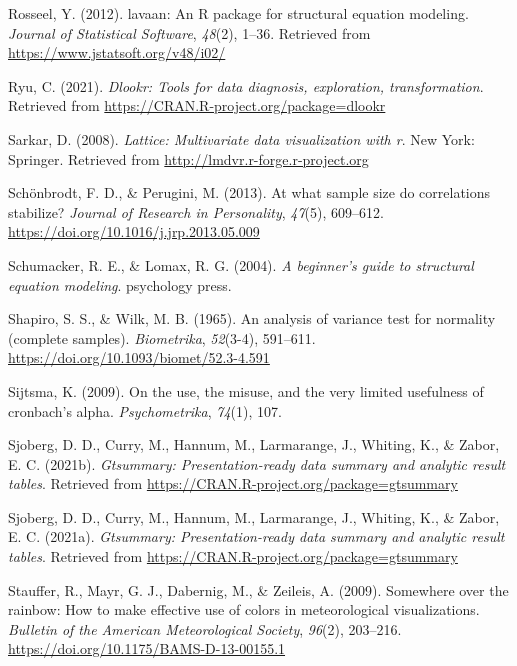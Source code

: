 \documentclass[
  english,
  man]{apa6}
\newlength{\cslhangindent}
\newlength{\cslentryspacingunit} %
\newenvironment{CSLReferences}[2] %
 {%
  \setlength{\parindent}{0pt}
  \ifodd #1
  \let\oldpar\par
  \def\par{\hangindent=\cslhangindent\oldpar}
  \fi
  \setlength{\parskip}{#2\cslentryspacingunit}
 }%
 {}
\begin{document}
\begin{CSLReferences}{1}{0}
\leavevmode{}%
Rosseel, Y. (2012). {lavaan}: An {R} package for structural equation modeling. \emph{Journal of Statistical Software}, \emph{48}(2), 1--36. Retrieved from \url{https://www.jstatsoft.org/v48/i02/}

\leavevmode{}%
Ryu, C. (2021). \emph{Dlookr: Tools for data diagnosis, exploration, transformation}. Retrieved from \url{https://CRAN.R-project.org/package=dlookr}

\leavevmode{}%
Sarkar, D. (2008). \emph{Lattice: Multivariate data visualization with r}. New York: Springer. Retrieved from \url{http://lmdvr.r-forge.r-project.org}

\leavevmode{}%
Schönbrodt, F. D., \& Perugini, M. (2013). At what sample size do correlations stabilize? \emph{Journal of Research in Personality}, \emph{47}(5), 609--612. \url{https://doi.org/10.1016/j.jrp.2013.05.009}

\leavevmode{}%
Schumacker, R. E., \& Lomax, R. G. (2004). \emph{A beginner's guide to structural equation modeling}. psychology press.

\leavevmode{}%
Shapiro, S. S., \& Wilk, M. B. (1965). An analysis of variance test for normality (complete samples). \emph{Biometrika}, \emph{52}(3-4), 591--611. \url{https://doi.org/10.1093/biomet/52.3-4.591}

\leavevmode{}%
Sijtsma, K. (2009). On the use, the misuse, and the very limited usefulness of cronbach's alpha. \emph{Psychometrika}, \emph{74}(1), 107.

\leavevmode{}%
Sjoberg, D. D., Curry, M., Hannum, M., Larmarange, J., Whiting, K., \& Zabor, E. C. (2021b). \emph{Gtsummary: Presentation-ready data summary and analytic result tables}. Retrieved from \url{https://CRAN.R-project.org/package=gtsummary}

\leavevmode{}%
Sjoberg, D. D., Curry, M., Hannum, M., Larmarange, J., Whiting, K., \& Zabor, E. C. (2021a). \emph{Gtsummary: Presentation-ready data summary and analytic result tables}. Retrieved from \url{https://CRAN.R-project.org/package=gtsummary}

\leavevmode{}%
Stauffer, R., Mayr, G. J., Dabernig, M., \& Zeileis, A. (2009). Somewhere over the rainbow: How to make effective use of colors in meteorological visualizations. \emph{Bulletin of the American Meteorological Society}, \emph{96}(2), 203--216. \url{https://doi.org/10.1175/BAMS-D-13-00155.1}


\end{CSLReferences}
\end{document}
